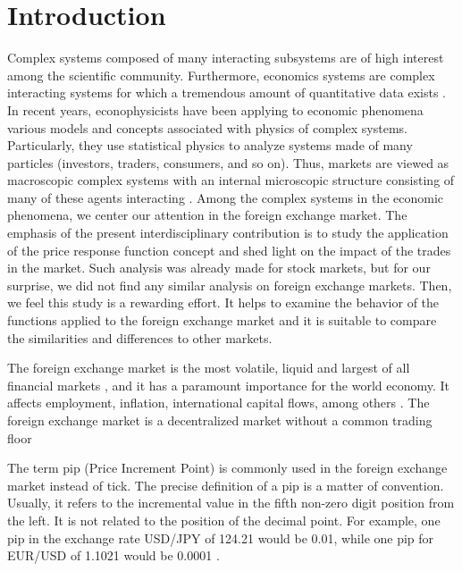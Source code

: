 \section{Introduction}\label{sec:introduction}

Complex systems composed of many interacting subsystems are of high interest
among the scientific community. Furthermore, economics systems are complex
interacting systems for which a tremendous amount of quantitative data exists
\cite{physicists_contribution}. In recent years, econophysicists have been
applying to economic phenomena various models and concepts associated with
physics of complex systems. Particularly, they use statistical physics to
analyze systems made of many particles (investors, traders, consumers,
and so on). Thus, markets are viewed as macroscopic complex systems with an
internal microscopic structure consisting of many of these agents interacting
\cite{complex_markets}. Among the complex systems in the economic phenomena,
we center our attention in the foreign exchange market. The emphasis of the
present interdisciplinary contribution is to study the application of the price
response function concept and shed light on the impact of the trades in the
market. Such analysis was already made for stock markets, but for our surprise,
we did not find any similar analysis on foreign exchange markets. Then, we feel
this study is a rewarding effort. It helps to examine the behavior of the
functions applied to the foreign exchange market and it is suitable to compare
the similarities and differences to other markets.

The foreign exchange market is the most volatile, liquid and largest of all
financial markets
\cite{forex_liquidity,info_forex,forex_market_micro,intraday_forex}, and it has
a paramount importance for the world economy. It affects employment, inflation,
international capital flows, among others \cite{forex_structure}. The foreign
exchange market is a decentralized market without a common trading floor
\cite{teach_spread,forex_structure,info_forex,forex_market_micro}

The term pip (Price Increment Point) is commonly used in the foreign exchange
market instead of tick. The precise definition of a pip is a matter of
convention. Usually, it refers to the incremental value in the fifth non-zero
digit position from the left. It is not related to the position of the decimal
point. For example, one pip in the exchange rate USD/JPY of 124.21 would be
0.01, while one pip for EUR/USD of 1.1021 would be 0.0001
\cite{order_flow_forex,forex_structure,micro_eff,forex_market_micro}.

